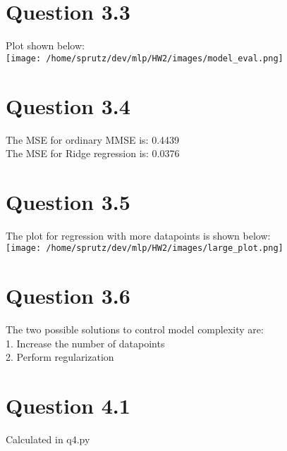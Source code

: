 \documentclass{article}
\begin{document}
\section*{Question 3.3}
Plot shown below:\\
\texttt{[image: /home/sprutz/dev/mlp/HW2/images/model\_eval.png]}

\section*{Question 3.4}
The MSE for ordinary MMSE is: 0.4439\\
The MSE for Ridge regression is: 0.0376

\section*{Question 3.5}
The plot for regression with more datapoints is shown below:\\
\texttt{[image: /home/sprutz/dev/mlp/HW2/images/large\_plot.png]}

\section*{Question 3.6}
The two possible solutions to control model complexity are:\\
1. Increase the number of datapoints\\
2. Perform regularization

\section*{Question 4.1}
Calculated in q4.py
\end{document}
